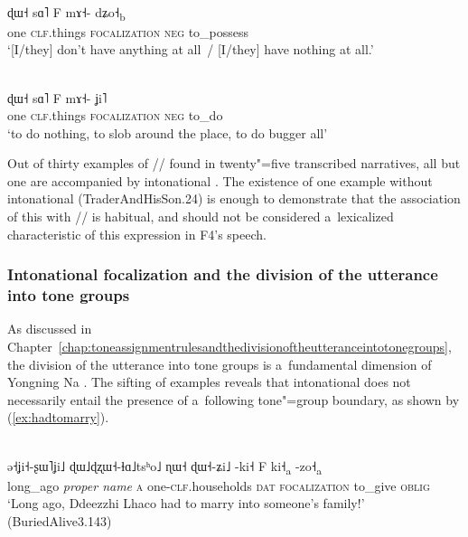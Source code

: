 \begin{exe}
	\ex
	\label{ex:isntanything}
	\\ 
	\gll ɖɯ˧	sɑ˥		F	mɤ˧-	dʑo˧\textsubscript{b}\\
	one		\textsc{clf}.things		\textsc{focalization}	\textsc{neg}		to\_possess\\
	\glt ‘[I/they] don't have anything at all~/ [I/they] have nothing at all.’
\end{exe}

\begin{exe}
	\ex
	\label{ex:donothing}
	\\ 
	\gll ɖɯ˧	sɑ˥		F	mɤ˧-	ʝi˥\\
	one		\textsc{clf}.things		\textsc{focalization}	\textsc{neg}		to\_do\\
	\glt ‘to do nothing, to slob around the place, to do bugger all’
\end{exe}

Out of thirty examples of // found in twenty"=five transcribed narratives, all but one are accompanied by intonational . The existence of one example without intonational  (Trader\-AndHisSon.24) is enough to demonstrate that the association of this  with // is habitual, and should not be considered a~lexicalized characteristic of this expression in F4’s speech. 


\subsubsection{Intonational focalization and the division of the utterance into tone groups}
\label{sec:intonationalfocalizationandthedivisionoftheutteranceintotonegroups}


As discussed in Chapter~\ref{chap:toneassignmentrulesandthedivisionoftheutteranceintotonegroups}, the division of the utterance into tone groups is a~fundamental dimension
of Yongning Na . The sifting of examples reveals that intonational  does not
necessarily entail the presence of a~following tone"=group boundary, as shown by (\ref{ex:hadtomarry}).


\begin{exe}
	\ex
	\label{ex:hadtomarry}
	\\ 
	\gll ə˧ʝi˧-ʂɯ˥ʝi˩	ɖɯ˩ɖʐɯ˧-ɬɑ˩tsʰo˩	ɳɯ˧				ɖɯ˧-ʑi˩		-ki˧	F	ki˧\textsubscript{a}	-zo˧\textsubscript{a}\\
	long\_ago	{\textit{proper name}}		\textsc{a}		one-\textsc{clf}.households				\textsc{dat}	\textsc{focalization}	to\_give	\textsc{oblig}\\
	\glt ‘Long ago, Ddeezzhi Lhaco had to marry into someone's family!’ {\newline}(BuriedAlive3.143)
\end{exe}

